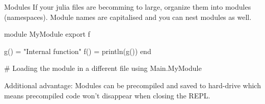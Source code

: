 \documentclass{beamer}
\newenvironment{Boxx}{\begin{tcolorbox}[standard jigsaw, opacityframe=0.8, opacityback=0.0]}{\end{tcolorbox}}
\begin{document}
\begin{frame}[fragile]{Modules}
If your julia files are becomming to large, organize them into modules (namespaces). Module names are capitalised and you can nest modules as well.
\begin{Boxx}
  \begin{jllisting}
  module MyModule
    export f

    g() = "Internal function"
    f() = println(g())
  end
  
  # Loading the module in a different file
  using Main.MyModule
  \end{jllisting}
\end{Boxx}
Additional advantage: Modules can be precompiled and saved to hard-drive which means precompiled code won't disappear when closing the REPL.
\end{frame}
\end{document}
